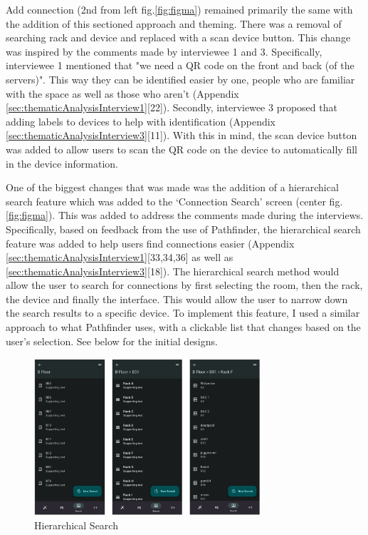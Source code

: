 \documentclass [11pt,a4paper]{article}
\begin{document}
Add connection (2nd from left fig.\ref{fig:figma}) remained primarily the same with the addition of this sectioned approach and theming. There was a removal of searching rack and device and replaced with a scan device button. This change was inspired by the comments made by interviewee 1 and 3. Specifically, interviewee 1 mentioned that "we need a QR code on the front and back (of the servers)". This way they can be identified easier by one, people who are familiar with the space as well as those who aren't (Appendix \ref{sec:thematicAnalysisInterview1}[22]). Secondly, interviewee 3 proposed that adding labels to devices to help with identification (Appendix \ref{sec:thematicAnalysisInterview3}[11]). With this in mind, the scan device button was added to allow users to scan the QR code on the device to automatically fill in the device information. 

One of the biggest changes that was made was the addition of a hierarchical search feature which was added to the `Connection Search' screen (center fig.\ref{fig:figma}). This was added to address the comments made during the interviews. Specifically, based on feedback from the use of Pathfinder, the hierarchical search feature was added to help users find connections easier (Appendix \ref{sec:thematicAnalysisInterview1}[33,34,36] as well as \ref{sec:thematicAnalysisInterview3}[18]). The hierarchical search method would allow the user to search for connections by first selecting the room, then the rack, the device and finally the interface. This would allow the user to narrow down the search results to a specific device. To implement this feature, I used a similar approach to what Pathfinder \cite{PathfinderMobile} uses, with a clickable list that changes based on the user's selection. See below for the initial designs.

\begin{figure}[H]
    \centering
    \includegraphics[width=0.75\textwidth]{images/heirarchy_search.png}
    \caption{Hierarchical Search}
    \label{fig:hierarchical_search}
\end{figure}
\end{document}
